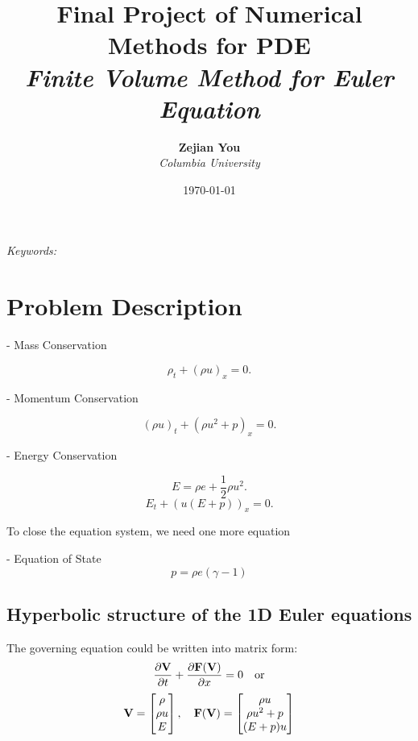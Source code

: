 \documentclass[11pt]{diazessay} %
\title{\textbf{Final Project of Numerical Methods for PDE} \\ {\Large\itshape Finite Volume Method for Euler Equation}} %
\author{\textbf{Zejian You} \\ \textit{Columbia University}} %
\date{\today} %
\begin{document}
\maketitle %



\begin{abstract}

\end{abstract}

\hspace*{3.6mm}\textit{Keywords:}  %

\vspace{30pt} %

\section{Problem Description}

- Mass Conservation
  
$$\rho_t + (\rho u)_x = 0.$$

- Momentum Conservation

$$(\rho u)_t + (\rho u^2 + p)_x = 0.$$

- Energy Conservation
  
$$E = \rho e + \frac{1}{2}\rho u^2.$$
$$E_t + (u(E+p))_x = 0.$$

To close the equation system, we need one more equation

- Equation of State
$$
p = \rho e(\gamma -1)
$$

\subsection{Hyperbolic structure of the 1D Euler equations}
The governing equation could be written into matrix form:
$$
    \frac{\partial \bf{V}}{\partial t} + \frac{\partial \bf{F}(\bf{V})}{\partial x} =0 \quad \text{or}
$$
$$
    \bf{V} = \begin{bmatrix}
        \rho \\ \rho u\\ E
    \end{bmatrix}, \quad \bf{F}(\bf{V})=\begin{bmatrix}
        \rho u \\\rho u^2 + p\\(E + p) u
    \end{bmatrix}
$$
\end{document}
